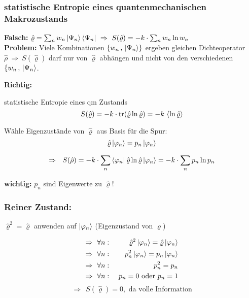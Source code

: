 \subsubsection{statistische Entropie eines quantenmechanischen Makrozustands}
\textbf{Falsch:} $\hat{\varrho} = \sum_n w_n \ket{\Psi_n}\bra{\Psi_n} \ \Rightarrow \ S(\hat{\varrho}) = -k\cdot\sum_n w_n \ln{w_n} $\\
\textbf{Problem:} Viele Kombinationen $\{w_n\, , \,\ket{\Psi_n}\}$ ergeben gleichen Dichteoperator $\hat{\rho} \ \Rightarrow \ S(\hat{\varrho})$ darf nur von $\hat{\varrho}$ abhängen und nicht von den verschiedenen $\{w_n\, ,\, \ket{\Psi_n}$.

\textbf{Richtig:} 
\begin{definition}{statistische Entropie eines qm Zustands}
    \begin{equation}
    S(\hat{\varrho}) = -k \cdot \trace (\hat{\varrho} \ln{\hat{\varrho}}) = -k \ \langle\ln{\hat{\varrho}}\rangle
    \end{equation}
\end{definition}

Wähle Eigenzustände von $\hat{\varrho}$ aus Basis für die Spur:
\begin{equation}
    \hat{\varrho} \ket{\varphi_n} = p_n \ket{\varphi_n}
\end{equation}


\begin{equation}
    \Rightarrow \ \ S(\hat{\rho}) = -k \cdot \sum_n \bra{\varphi_n} \hat{\varrho} \ln\hat{\varrho} \ket{\varphi_n} = -k \cdot \sum_n p_n \ln{p_n}
\end{equation}

\textbf{wichtig:} $p_n$ sind Eigenwerte zu $\hat{\varrho}$! 

\subsubsection*{Reiner Zustand:}
$\hat{\varrho}^2 = \hat{\varrho}$ anwenden auf $\ket{\varphi_n}$ (Eigenzustand von $\varrho$)

\begin{align}
    \Rightarrow \ \forall n: \ &&\hat{\varrho}^2 \ket{\varphi_n} = \hat{\varrho} \ket{\varphi_n}  \\
    \Rightarrow \ \forall n: \ &&p_n^2 \ket{\varphi_n} = p_n \ket{\varphi_n} \\
    \Rightarrow \ \forall n: \  &&p_n^2= p_n \\
    \Rightarrow \  \forall n: \  &&p_n = 0 \text{ oder } p_n = 1 \\
\end{align}
 \begin{equation}
   \Rightarrow \  \  S(\hat{\varrho}) = 0 , \text{ da volle Information}  
 \end{equation}
 

